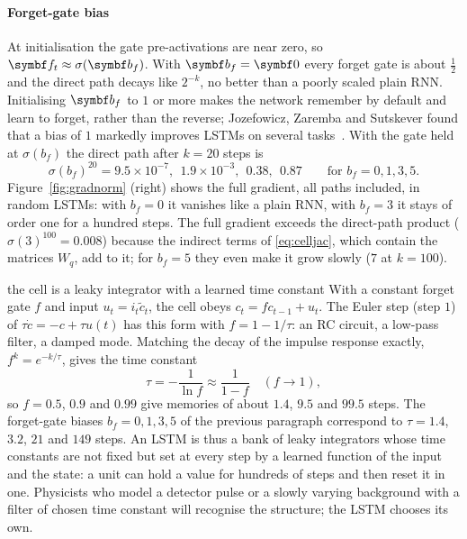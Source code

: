 \documentclass[11pt]{article}
\newcommand{\bv}{\vect{b}}
\newcommand{\fv}{\vect{f}}
\begin{document}
\paragraph{Forget-gate bias} At initialisation the gate pre-activations are near zero, so $\fv_t \approx \sigma(\bv_f)$.
With $\bv_f = \vect{0}$ every forget gate is about $\frac12$ and the direct path decays like $2^{-k}$, no better than a poorly
scaled plain RNN. Initialising $\bv_f$ to $1$ or more makes the network remember by default and learn to forget, rather
than the reverse; Jozefowicz, Zaremba and Sutskever found that a bias of $1$ markedly improves LSTMs on several
tasks~\cite{jozefowicz2015}. With the gate held at $\sigma(b_f)$ the direct path after $k = 20$ steps is
\[
  \sigma(b_f)^{20} = 9.5 \times 10^{-7},\ \ 1.9 \times 10^{-3},\ \ 0.38,\ \ 0.87 \qquad\text{for } b_f = 0, 1, 3, 5 .
\]
Figure~\ref{fig:gradnorm} (right) shows the full gradient, all paths included, in random LSTMs: with $b_f = 0$ it vanishes
like a plain RNN, with $b_f = 3$ it stays of order one for a hundred steps. The full gradient exceeds the direct-path
product ($\sigma(3)^{100} = 0.008$) because the indirect terms of \eqref{eq:celljac}, which contain the matrices $W_q$,
add to it; for $b_f = 5$ they even make it grow slowly ($7$ at $k = 100$).

\begin{physics}{the cell is a leaky integrator with a learned time constant}
With a constant forget gate $f$ and input $u_t = i_t\tilde c_t$, the cell obeys $c_t = f c_{t-1} + u_t$. The Euler step
(step $1$) of $\tau\dot c = -c + \tau u(t)$ has this form with $f = 1 - 1/\tau$: an RC circuit, a low-pass filter, a damped
mode. Matching the decay of the impulse response exactly, $f^k = e^{-k/\tau}$, gives the time constant
\[
  \tau = -\frac{1}{\ln f} \approx \frac{1}{1 - f} \quad (f \to 1) ,
\]
so $f = 0.5$, $0.9$ and $0.99$ give memories of about $1.4$, $9.5$ and $99.5$ steps. The forget-gate biases $b_f = 0, 1, 3, 5$ of
the previous paragraph correspond to $\tau = 1.4$, $3.2$, $21$ and $149$ steps. An LSTM is thus a bank of leaky integrators
whose time constants are not fixed but set at every step by a learned function of the input and the state: a unit
can hold a value for hundreds of steps and then reset it in one. Physicists who model a detector pulse or a slowly
varying background with a filter of chosen time constant will recognise the structure; the LSTM chooses its own.
\end{physics}
\end{document}
